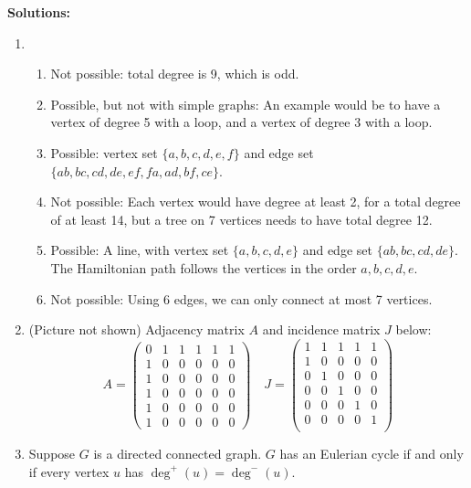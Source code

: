 \documentclass[a4paper,12pt]{article}
\begin{document}
\newpage

{\bf Solutions:}

\begin{enumerate}
\item
    \begin{enumerate}
    \item Not possible: total degree is 9, which is odd.
    \item Possible, but not with simple graphs: An example would be to have
    a vertex of degree 5 with a loop, and a vertex of degree 3 with a loop.
    \item Possible: vertex set $\{a, b, c, d, e, f\}$ and edge set
    $\{ab, bc, cd, de, ef, fa, ad, bf, ce\}$.
    \item Not possible: Each vertex would have degree at least 2, for a total
    degree of at least 14, but a tree on 7 vertices needs to have total degree
    12.
    \item Possible: A line, with vertex set $\{a,b,c,d,e\}$ and edge set
    $\{ab, bc, cd, de\}$. The Hamiltonian path follows the vertices in the order
    $a, b, c, d, e$.
    \item Not possible: Using 6 edges, we can only connect at most 7 vertices.
    \end{enumerate}
\item
    (Picture not shown)
    Adjacency matrix $A$ and incidence matrix $J$ below:
    \[
    A = \begin{pmatrix}
        0 & 1 & 1 & 1 & 1 & 1 \\
        1 & 0 & 0 & 0 & 0 & 0 \\
        1 & 0 & 0 & 0 & 0 & 0 \\
        1 & 0 & 0 & 0 & 0 & 0 \\
        1 & 0 & 0 & 0 & 0 & 0 \\
        1 & 0 & 0 & 0 & 0 & 0
    \end{pmatrix}
    \quad
    J = \begin{pmatrix}
        1 & 1 & 1 & 1 & 1 \\
        1 & 0 & 0 & 0 & 0 \\
        0 & 1 & 0 & 0 & 0 \\
        0 & 0 & 1 & 0 & 0 \\
        0 & 0 & 0 & 1 & 0 \\
        0 & 0 & 0 & 0 & 1 \\
    \end{pmatrix}
    \]
\item
    Suppose $G$ is a directed connected graph.
    $G$ has an Eulerian cycle if and only if every vertex $u$ has
    $\deg^+(u) = \deg^-(u)$.


\end{enumerate}
\end{document}
